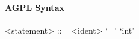 \documentclass{article}
\begin{document}
\paragraph{AGPL Syntax}
\begin{grammar}
<statement> ::= <ident> `=' `int'
\end{grammar}
\end{document}
